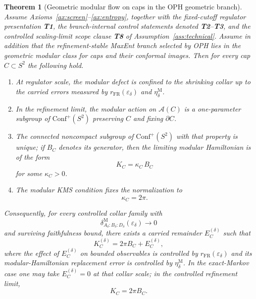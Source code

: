 \documentclass[11pt]{article}
\newtheorem{theorem}{Theorem}[section]
\newcommand{\Conf}{\mathrm{Conf}}
\begin{document}
\begin{theorem}[Geometric modular flow on caps in the OPH geometric branch]\label{thm:bw}
Assume Axioms~\ref{ax:screen}--\ref{ax:entropy}, together with the fixed-cutoff regulator presentation \textbf{T1}, the branch-internal control statements denoted \textbf{T2}--\textbf{T3}, and the controlled scaling-limit scope clause \textbf{T8} of Assumption~\ref{ass:technical}. Assume in addition that the refinement-stable MaxEnt branch selected by OPH lies in the geometric modular class for caps and their conformal images. Then for every cap \(C\subset S^2\) the following hold.
\begin{enumerate}[label=\textup{(\roman*)},leftmargin=2em]
\item At regulator scale, the modular defect is confined to the shrinking collar up to the carried errors measured by \(r_{\mathrm{FR}}(\varepsilon_\delta)\) and \(\eta_\delta^{\mathrm M}\).
\item In the refinement limit, the modular action on \(\mathcal A(C)\) is a one-parameter subgroup of \(\Conf^+(S^2)\) preserving \(C\) and fixing \(\partial C\).
\item The connected noncompact subgroup of \(\Conf^+(S^2)\) with that property is unique; if \(B_C\) denotes its generator, then the limiting modular Hamiltonian is of the form
\[
K_C=\kappa_C\,B_C
\]
for some \(\kappa_C>0\).
\item The modular KMS condition fixes the normalization to
\[
\kappa_C=2\pi.
\]
\end{enumerate}

Consequently, for every controlled collar family with
\[
\delta^{\mathrm M}_{A_\delta:B_\delta:D_\delta}(\varepsilon_\delta)\to 0
\]
and surviving faithfulness bound, there exists a carried remainder \(E_C^{(\delta)}\) such that
\[
K_C^{(\delta)}=2\pi B_C+E_C^{(\delta)},
\]
where the effect of \(E_C^{(\delta)}\) on bounded observables is controlled by \(r_{\mathrm{FR}}(\varepsilon_\delta)\) and its modular-Hamiltonian replacement error is controlled by \(\eta_\delta^{\mathrm M}\). In the exact-Markov case one may take \(E_C^{(\delta)}=0\) at that collar scale; in the controlled refinement limit,
\[
K_C=2\pi B_C.
\]
\end{theorem}
\end{document}
